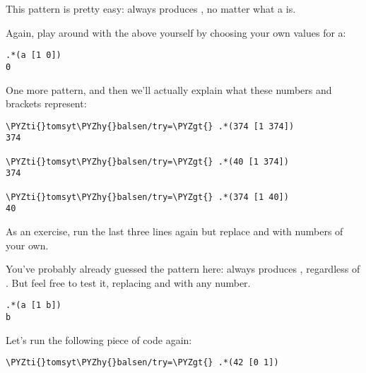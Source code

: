This pattern is pretty easy:  always produces , no matter what a
is.

Again, play around with the above yourself by choosing your own values for a: 

\begin{framed_shaded}
\begin{Verbatim}[fontsize=\relsize{-2.5},commandchars=\\\{\}]
.*(a [1 0])
0
\end{Verbatim}
\end{framed_shaded}

One more pattern, and then we'll actually explain what these numbers and brackets represent:

\begin{framed_shaded}
\begin{Verbatim}[fontsize=\relsize{-2.5},commandchars=\\\{\}]
\PYZti{}tomsyt\PYZhy{}balsen/try=\PYZgt{} .*(374 [1 374])
374

\PYZti{}tomsyt\PYZhy{}balsen/try=\PYZgt{} .*(40 [1 374])
374

\PYZti{}tomsyt\PYZhy{}balsen/try=\PYZgt{} .*(374 [1 40])
40
\end{Verbatim}
\end{framed_shaded}

As an exercise, run the last three lines again but replace  and  with
numbers of your own.

You've probably already guessed the pattern here:  always produces
, regardless of . But feel free to test it, replacing  and  with any number. 

\begin{framed_shaded}
\begin{Verbatim}[fontsize=\relsize{-2.5},commandchars=\\\{\}]
.*(a [1 b])
b
\end{Verbatim}
\end{framed_shaded}

Let's run the following piece of code again:

\begin{framed_shaded}
\begin{Verbatim}[fontsize=\relsize{-2.5},commandchars=\\\{\}]
\PYZti{}tomsyt\PYZhy{}balsen/try=\PYZgt{} .*(42 [0 1])
\end{Verbatim}
\end{framed_shaded}

